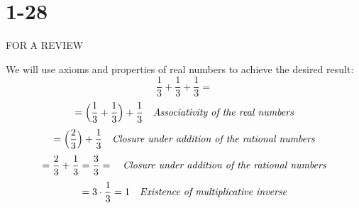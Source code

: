\documentclass{article}
\begin{document}
\section*{1-28}
\begin{center}
    FOR A REVIEW
\end{center}
We will use axioms and properties of real numbers to achieve the desired result:
\begin{equation*}
    \frac{1}{3} + \frac{1}{3} + \frac{1}{3} = 
\end{equation*}
\begin{equation*}
    = \Big(\frac{1}{3} + \frac{1}{3}\Big) + \frac{1}{3} \ \ \ \mbox{\emph{Associativity of the real numbers}}
\end{equation*}
\begin{equation*}
    = \Big(\frac{2}{3}\Big) + \frac{1}{3} \ \ \ \mbox{\emph{Closure under addition of the rational numbers}}
\end{equation*}
\begin{equation*}
    = \frac{2}{3} + \frac{1}{3} = \frac{3}{3} = \ \ \ \mbox{\emph{Closure under addition of the rational numbers}}
\end{equation*}
\begin{equation*}
    =  3 \cdot \frac{1}{3} = 1 \ \ \ \mbox{\emph{Existence of multiplicative inverse}}
\end{equation*}
\end{document}
